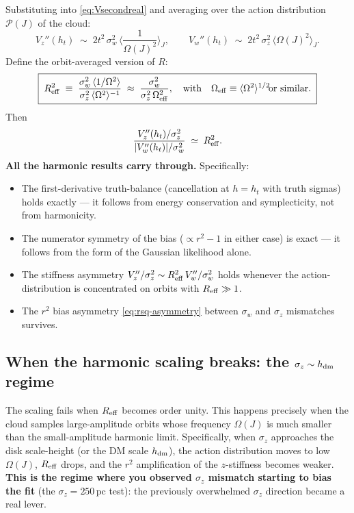 \documentclass[11pt]{article}
\begin{document}
Substituting into \eqref{eq:Vsecondreal} and averaging over the action distribution
$\mathcal P(J)$ of the cloud:
\begin{equation}
V_z''(h_t)\;\sim\;2t^2\,\sigma_w^2\,\Big\langle\frac{1}{\Omega(J)^2}\Big\rangle_J,
\qquad
V_w''(h_t)\;\sim\;2t^2\,\sigma_z^2\,\big\langle\Omega(J)^2\big\rangle_J.
\end{equation}
Define the orbit-averaged version of $R$:
\begin{equation}
\boxed{\;
R_{\rm eff}^2 \;\equiv\; \frac{\sigma_w^2\,\langle 1/\Omega^2\rangle}{\sigma_z^2\,\langle\Omega^2\rangle^{-1}}
\;\approx\;\frac{\sigma_w^2}{\sigma_z^2\,\Omega_{\rm eff}^2},
\quad\text{with}\quad \Omega_{\rm eff}\equiv\langle\Omega^{2}\rangle^{1/2}\!\!\!\text{ or similar.}
\;}
\end{equation}
Then
\begin{equation}
\frac{V_z''(h_t)/\sigma_z^2}{|V_w''(h_t)|/\sigma_w^2}\;\simeq\;R_{\rm eff}^2.
\end{equation}
\textbf{All the harmonic results carry through.} Specifically:
\begin{itemize}
\item The first-derivative truth-balance (cancellation at $h=h_t$ with truth sigmas)
holds exactly — it follows from energy conservation and symplecticity, not from
harmonicity.
\item The numerator symmetry of the bias ($\propto r^2-1$ in either case) is exact —
it follows from the form of the Gaussian likelihood alone.
\item The stiffness asymmetry $V_z''/\sigma_z^2 \sim R_{\rm eff}^2\,V_w''/\sigma_w^2$
holds whenever the action-distribution is concentrated on orbits with $R_{\rm eff}\gg 1$.
\item The $r^2$ bias asymmetry \eqref{eq:rsq-asymmetry} between $\sigma_w$ and
$\sigma_z$ mismatches survives.
\end{itemize}

\subsection{When the harmonic scaling breaks: the $\sigma_z\sim h_{\rm dm}$ regime}

The scaling fails when $R_{\rm eff}$ becomes order unity. This happens precisely when
the cloud samples large-amplitude orbits whose frequency $\Omega(J)$ is much smaller
than the small-amplitude harmonic limit. Specifically, when $\sigma_z$ approaches the
disk scale-height (or the DM scale $h_{\rm dm}$), the action distribution moves to low
$\Omega(J)$, $R_{\rm eff}$ drops, and the $r^2$ amplification of the $z$-stiffness
becomes weaker. \textbf{This is the regime where you observed $\sigma_z$ mismatch
starting to bias the fit} (the $\sigma_z=250\,\mathrm{pc}$ test): the previously
overwhelmed $\sigma_z$ direction became a real lever.
\end{document}
